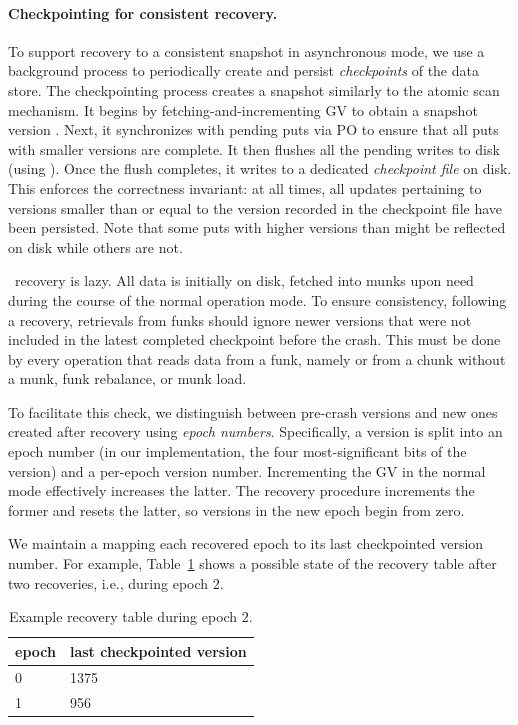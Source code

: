 \paragraph{Checkpointing for consistent recovery.}
To support recovery to a consistent snapshot in asynchronous mode, we use a background process to
periodically create and persist \emph{checkpoints} of the data store.
The checkpointing process creates a snapshot similarly to the atomic scan mechanism. 
It begins by fetching-and-incrementing GV to obtain a 
 snapshot version .  Next, 
it synchronizes with pending puts via PO to ensure that all puts with smaller versions are complete. 
It then flushes all the pending writes to disk (using ). 
Once the flush completes, it writes  to a dedicated \emph{checkpoint file} on disk.
This enforces the correctness invariant: at all times, all updates pertaining to versions smaller 
than or equal to the version recorded in the checkpoint file have been persisted.
Note that some puts with higher versions than  might be reflected on disk while others are not. 

\sys\ recovery is lazy. All data is initially on disk, fetched into munks upon need during the course of the normal operation mode. 
To ensure consistency, following a recovery,  
retrievals from funks should ignore newer versions that were not included in the latest completed checkpoint before the crash. 
This must be done by every operation that reads data from a funk, namely  or  from a chunk without a munk, 
funk rebalance, or munk load. 

To facilitate this check, we distinguish between pre-crash versions and new ones created after recovery using \emph{epoch numbers}. 
Specifically, a version is split into an epoch number (in our implementation, the four most-significant bits of the version) and a per-epoch version number. 
Incrementing the GV in the normal mode effectively increases the latter.
The recovery procedure increments the former and resets the latter, so 
versions in the new epoch begin from zero. 

We maintain a  mapping each recovered epoch to its last checkpointed version number. 
For example, Table~\ref{table:recovery} shows a possible state of the recovery table after two recoveries, i.e., during epoch $2$. 

\begin{table}
\begin{center}
\begin{tabular}{ll}
epoch & last checkpointed version \\
\hline
0 & 1375\\
1 &  956\\
\end{tabular}
\end{center}
\caption{Example recovery table during epoch $2$.}
\label{table:recovery}
\end{table} 
 
